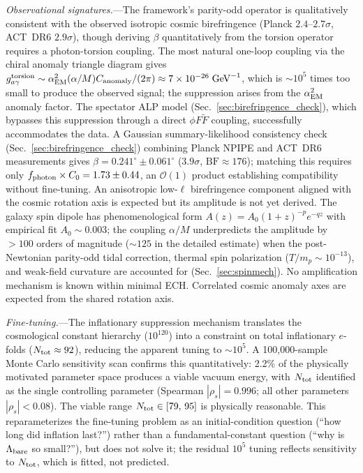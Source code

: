 \documentclass[aps,prd,twocolumn,superscriptaddress,showpacs,preprintnumbers,nofootinbib,longbibliography,floatfix]{revtex4-2}
\begin{document}
\textit{Observational signatures.}---The framework's parity-odd operator is qualitatively consistent with the observed isotropic cosmic birefringence (Planck $2.4$--$2.7\sigma$, ACT~DR6 $2.9\sigma$), though deriving $\beta$ quantitatively from the torsion operator requires a photon-torsion coupling. The most natural one-loop coupling via the chiral anomaly triangle diagram gives $g_{a\gamma}^{\rm torsion} \sim \alpha_{\rm EM}^2 (\alpha/M) C_{\rm anomaly} / (2\pi) \approx 7 \times 10^{-26}\;\text{GeV}^{-1}$, which is $\sim 10^5$ times too small to produce the observed signal; the suppression arises from the $\alpha_{\rm EM}^2$ anomaly factor. The spectator ALP model (Sec.~\ref{sec:birefringence_check}), which bypasses this suppression through a direct $\phi F\tilde{F}$ coupling, successfully accommodates the data. A Gaussian summary-likelihood consistency check (Sec.~\ref{sec:birefringence_check}) combining Planck NPIPE and ACT~DR6 measurements gives $\beta = 0.241^\circ \pm 0.061^\circ$ ($3.9\sigma$, $\mathrm{BF} \approx 176$); matching this requires only $f_{\rm photon} \times C_0 = 1.73 \pm 0.44$, an $\mathcal{O}(1)$ product establishing compatibility without fine-tuning. An anisotropic low-$\ell$ birefringence component aligned with the cosmic rotation axis is expected but its amplitude is not yet derived. The galaxy spin dipole has phenomenological form $A(z)=A_0(1+z)^{-p}e^{-qz}$ with empirical fit $A_0 \sim 0.003$; the coupling $\alpha/M$ underpredicts the amplitude by ${>}100$ orders of magnitude (${\sim}125$ in the detailed estimate) when the post-Newtonian parity-odd tidal correction, thermal spin polarization ($T/m_p \sim 10^{-13}$), and weak-field curvature are accounted for (Sec.~\ref{sec:spinmech}). No amplification mechanism is known within minimal ECH. Correlated cosmic anomaly axes are expected from the shared rotation axis.

\textit{Fine-tuning.}---The inflationary suppression mechanism translates the cosmological constant hierarchy ($10^{120}$) into a constraint on total inflationary $e$-folds ($N_{\rm tot}\approx 92$), reducing the apparent tuning to $\sim 10^5$. A 100{,}000-sample Monte Carlo sensitivity scan confirms this quantitatively: 2.2\% of the physically motivated parameter space produces a viable vacuum energy, with $N_{\rm tot}$ identified as the single controlling parameter (Spearman $|\rho_s| = 0.996$; all other parameters $|\rho_s| < 0.08$). The viable range $N_{\rm tot} \in [79,\,95]$ is physically reasonable. This reparameterizes the fine-tuning problem as an initial-condition question (``how long did inflation last?'') rather than a fundamental-constant question (``why is $\Lambda_{\rm bare}$ so small?''), but does not solve it; the residual $10^5$ tuning reflects sensitivity to $N_{\rm tot}$, which is fitted, not predicted.
\end{document}
